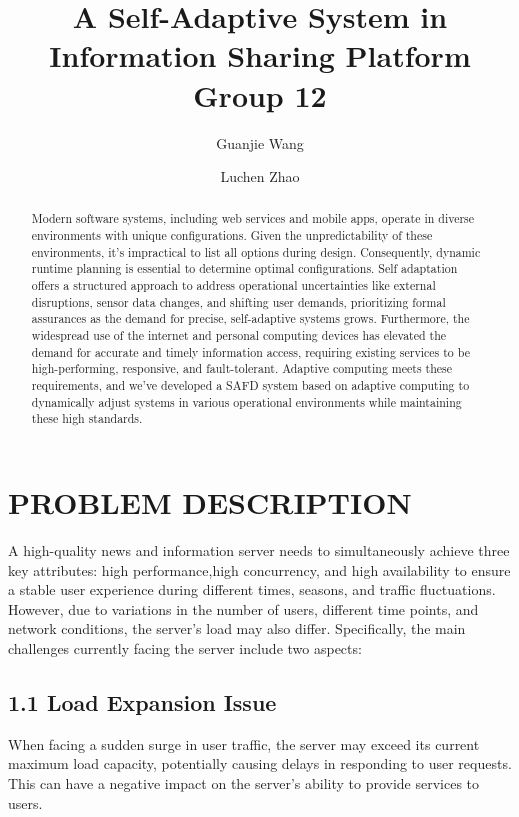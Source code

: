 \documentclass[sigconf]{acmart}
\title{A Self-Adaptive System in Information Sharing Platform\\
Group 12
}
\author{Guanjie Wang}
\affiliation{%
  \institution{University of Waterloo}
  \city{Waterloo}
  \state{Ontario}
  \country{Canada}\\
  \texttt{t73wang@uwaterloo.ca}
}
\author{Luchen Zhao}
\affiliation{%
  \institution{University of Waterloo}
  \city{Waterloo}
  \state{Ontario}
  \country{Canada}\\
  \texttt{l32zhao@uwaterloo.ca}
}
\begin{document}
\begin{abstract}
Modern software systems, including web services and mobile apps, operate in 
diverse environments with unique configurations. Given the unpredictability 
of these environments, it's impractical to list all options during design. 
Consequently, dynamic runtime planning is essential to determine optimal configurations\cite{FredericksErikM.2019PaOD}. 
Self adaptation offers a structured approach to address operational uncertainties
 like external disruptions, sensor data changes, and shifting user demands, 
 prioritizing formal assurances as the demand for precise, 
 self-adaptive systems grows\cite{ShevtsovStepan2019SACA}. 
 Furthermore, the widespread use of the internet and personal computing devices has
  elevated the demand for accurate and timely information access, 
  requiring existing services to be high-performing, responsive, and fault-tolerant. 
  Adaptive computing meets these requirements, and we've developed a SAFD system 
  based on adaptive computing to dynamically adjust systems in various operational 
  environments while maintaining these high standards.
\end{abstract}

\maketitle
\pagestyle{plain}

\section{PROBLEM DESCRIPTION}
A high-quality news and information server needs to simultaneously achieve three key attributes: 
high performance,high concurrency, and high availability to ensure a stable user experience 
during different times, seasons, and traffic fluctuations. However, due to variations in 
the number of users, different time points, and network conditions, the server's load may also differ. 
Specifically, the main challenges currently facing the server include two aspects:
\subsection*{1.1 Load Expansion Issue}
When facing a sudden surge in user traffic, the server may exceed its current maximum load capacity, 
potentially causing delays in responding to user requests. This can have a negative impact on the 
server's ability to provide services to users.
\end{document}
